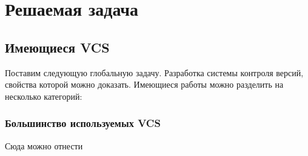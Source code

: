 \section{Решаемая задача}

\subsection{Имеющиеся VCS}

Поставим следующую глобальную задачу. Разработка системы контроля
версий, свойства которой можно доказать. Имеющиеся работы можно
разделить на несколько категорий:

\subsubsection{Большинство используемых VCS}

Сюда можно отнести 
